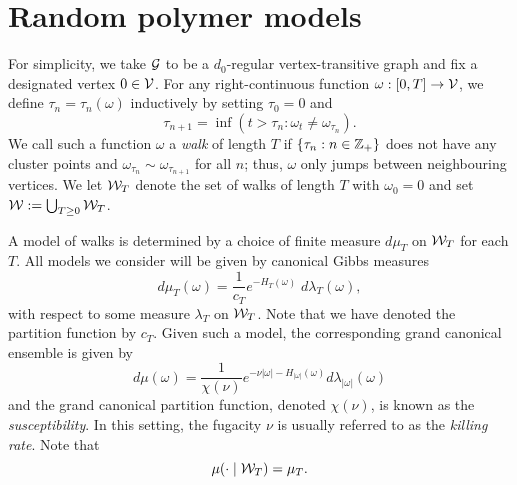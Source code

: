 
\section{Random polymer models}

For simplicity, we take $\mathcal{G}$ to be a $d_0$-regular vertex-transitive graph and fix a designated vertex $0 \in \mathcal{V}$.
For any right-continuous function $\omega : [0, T] \rightarrow \mathcal{V}$, we define
$\tau_n = \tau_n(\omega)$ inductively by setting $\tau_0 = 0$ and
\begin{equation}
\tau_{n+1} = \inf(t > \tau_n : \omega_t \ne \omega_{\tau_n}).
\end{equation}
We call such a function $\omega$ a \emph{walk} of length $T$ if
$\{ \tau_n : n \in {\mathbb Z}_+ \}$ does not have any cluster points and
$\omega_{\tau_n} \sim \omega_{\tau_{n+1}}$ for all $n$; thus, $\omega$
only jumps between neighbouring vertices.
We let $\mathcal{W}_T$ denote the set of walks of length $T$ with $\omega_0 = 0$ and set $\mathcal{W} := \bigcup_{T \geq 0} \mathcal{W}_T$.

A model of walks is determined by a choice of finite measure $d\mu_T$ on
$\mathcal{W}_T$ for each $T$. All models we consider will be given by canonical Gibbs measures
\begin{equation}
d\mu_T(\omega) = \frac{1}{c_T} e^{-H_T(\omega)} \; d\lambda_T(\omega),
\end{equation}
with respect to some measure $\lambda_T$ on $\mathcal{W}_T$. Note that we have denoted the partition function by $c_T$.
Given such a model, the corresponding grand canonical ensemble is given by
\begin{equation}
d\mu(\omega)
  =
\frac{1}{\chi(\nu)}
e^{-\nu |\omega| - H_{|\omega|}(\omega)}
d\lambda_{|\omega|}(\omega)
\end{equation}
and the grand canonical partition function, denoted $\chi(\nu)$, is known as the \emph{susceptibility}. In this setting, the fugacity $\nu$ is usually referred to as the \emph{killing rate}.
Note that
\begin{equation}
\mu(\cdot \mid \mathcal{W}_T) = \mu_T.
\end{equation}


